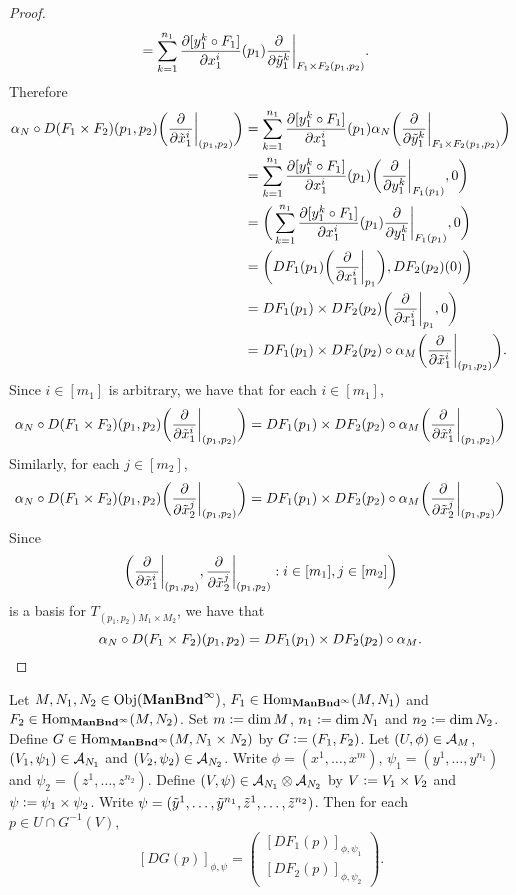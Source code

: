 \documentclass{book}
\begin{document}
\begin{proof}
\begin{align*}
			& = \sum_{k=1}^{n_1} \frac{\partial [y^k_1 \circ F_1]}{\partial x_1^i} (p_1) \frac{\partial }{\partial \tilde{y}^k_1} \bigg|_{F_1 \times F_2 (p_1, p_2)}.
		\end{align*}
		Therefore 
		\begin{align*}
			\alpha_N \circ D(F_1 \times F_2)(p_1, p_2) \bigg( \frac{\partial}{\partial \tilde{x}_1^i} \bigg|_{(p_1, p_2)} \bigg) 
			& = \sum_{k=1}^{n_1} \frac{\partial [y^k_1 \circ F_1]}{\partial x_1^i} (p_1) \alpha_N \bigg( \frac{\partial }{\partial \tilde{y}^k_1} \bigg|_{F_1 \times F_2 (p_1, p_2)} \bigg) \\
			& = \sum_{k=1}^{n_1} \frac{\partial [y^k_1 \circ F_1]}{\partial x_1^i} (p_1) \bigg( \frac{\partial }{\partial y^k_1} \bigg|_{F_1 (p_1)} , 0 \bigg) \\
			& = \bigg( \sum_{k=1}^{n_1} \frac{\partial [y^k_1 \circ F_1]}{\partial x_1^i} (p_1) \frac{\partial }{\partial y^k_1} \bigg|_{F_1 (p_1)} , 0 \bigg) \\
			& = \bigg( DF_1(p_1)\bigg( \frac{\partial}{\partial x_1^i} \bigg|_{p_1} \bigg), DF_2(p_2)(0)  \bigg) \\
			& = DF_1(p_1) \times DF_2(p_2) \bigg( \frac{\partial}{\partial x_1^i} \bigg|_{p_1}, 0 \bigg) \\
			& = DF_1(p_1) \times DF_2(p_2) \circ \alpha_M \bigg( \frac{\partial}{\partial \tilde{x}_1^i} \bigg|_{(p_1, p_2)} \bigg).
		\end{align*}
	Since $i \in [m_1]$ is arbitrary, we have that for each $i \in [m_1]$, 
	$$\alpha_N \circ D(F_1 \times F_2)(p_1, p_2) \bigg( \frac{\partial}{\partial \tilde{x}_1^i} \bigg|_{(p_1, p_2)} \bigg) = DF_1(p_1) \times DF_2(p_2) \circ \alpha_M \bigg( \frac{\partial}{\partial \tilde{x}_1^i} \bigg|_{(p_1, p_2)} \bigg)$$
	Similarly, for each $j \in [m_2]$, 
	$$\alpha_N \circ D(F_1 \times F_2)(p_1, p_2) \bigg( \frac{\partial}{\partial \tilde{x}_2^j} \bigg|_{(p_1, p_2)} \bigg) = DF_1(p_1) \times DF_2(p_2) \circ \alpha_M \bigg( \frac{\partial}{\partial \tilde{x}_2^j} \bigg|_{(p_1, p_2)}  \bigg)$$
	Since $$\bigg(  \frac{\partial}{\partial \tilde{x}_1^i} \bigg|_{(p_1, p_2)},  \frac{\partial}{\partial \tilde{x}_2^j} \bigg|_{(p_1, p_2)} : i \in [m_1], j \in [m_2]\bigg)$$
	is a basis for $T_{(p_1, p_2) M_1 \times M_2}$, we have that  
	$$\alpha_N \circ D(F_1 \times F_2)(p_1, p_2) = DF_1(p_1) \times DF_2(p_2) \circ \alpha_M.$$
	\end{proof}


	\begin{ex} 
		Let $M,N_1, N_2 \in \operatorname{Obj}(\operatorname*{\text{\textbf{ManBnd}}^{\infty}})$, $F_1 \in \operatorname{Hom}_{\operatorname*{\text{\textbf{ManBnd}}^{\infty}}}(M, N_1)$ and $F_2 \in \operatorname{Hom}_{\operatorname*{\text{\textbf{ManBnd}}^{\infty}}}(M, N_2)$. Set $m \vcentcolon= \dim M$, $n_1 \vcentcolon= \dim N_1$ and $n_2 \vcentcolon= \dim N_2$. Define $G \in \operatorname{Hom}_{\operatorname*{\text{\textbf{ManBnd}}^{\infty}}}(M, N_1 \times N_2)$ by $G \vcentcolon= (F_1, F_2)$. Let $(U, \phi) \in \mathcal{A}_M$, $(V_1, \psi_1) \in \mathcal{A}_{N_1}$ and $(V_2, \psi_2) \in \mathcal{A}_{N_2}$. Write $\phi = (x^1, \ldots, x^m)$, $\psi_1 = (y^1, \ldots, y^{n_1})$ and $\psi_2 = (z^1, \ldots, z^{n_2})$. Define $(V, \psi) \in \mathcal{A}_{N_1} \otimes \mathcal{A}_{N_2}$ by $V \vcentcolon= V_1 \times V_2$ and $\psi \vcentcolon= \psi_1 \times \psi_2$. Write $\psi = (\tilde{y}^1, \ldots, \tilde{y}^{n_1}, \tilde{z}^1, \ldots, \tilde{z}^{n_2})$. Then for each $p \in U \cap G^{-1}(V)$, 
		$$[DG(p)]_{\phi, \psi} = 
		\begin{pmatrix}
			[DF_1(p)]_{\phi, \psi_1} \\
			[DF_2(p)]_{\phi, \psi_2}
		\end{pmatrix}.$$
	\end{ex}
\end{document}
